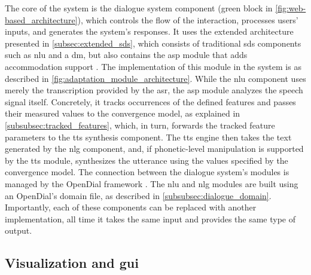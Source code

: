 The core of the system is the dialogue system component (green block in \cref{fig:web-based_architecture}), which controls the flow of the interaction, processes users' inputs, and generates the system's responses.
It uses the extended architecture presented in \cref{subsec:extended_sds}, which consists of traditional \ac{sds} components such as \ac{nlu} and a \ac{dm}, but also contains the \ac{asp} module that adds accommodation support \citep{Raveh2017SemDial}.
The implementation of this module in the system is as described in \cref{fig:adaptation_module_architecture}.
While the \ac{nlu} component uses merely the transcription provided by the \ac{asr}, the \ac{asp} module analyzes the speech signal itself.
Concretely, it tracks occurrences of the defined features and passes their measured values to the convergence model, as explained in \cref{subsubsec:tracked_features}, which, in turn, forwards the tracked feature parameters to the \ac{tts} synthesis component.
The \ac{tts} engine then takes the text generated by the \ac{nlg} component, and, if phonetic-level manipulation is supported by the \ac{tts} module, synthesizes the utterance using the values specified by the convergence model.
The connection between the dialogue system's modules is managed by the OpenDial framework \citep{Lison2016opendial, Lison2015developing}.
The \ac{nlu} and \ac{nlg} modules are built using an OpenDial's domain file, as described in \cref{subsubsec:dialogue_domain}.
Importantly, each of these components can be replaced with another implementation, all time it takes the same input and provides the same type of output.

\subsection{Visualization and \acl{gui}}
\label{subsec:graphical_user_interface}

